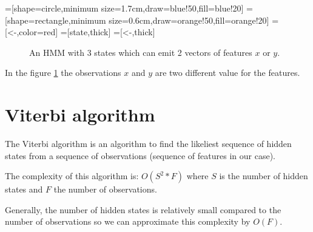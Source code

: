 \documentclass{techrep} %
\begin{document}
=[shape=circle,minimum size=1.7cm,draw=blue!50,fill=blue!20]
=[shape=rectangle,minimum size=0.6cm,draw=orange!50,fill=orange!20]
=[<-,color=red] =[state,thick]
=[<-,thick]
\begin{figure}[H]
  \begin{center}
  \end{center}
  \label{hmm}
  \caption{An HMM with 3 states which can emit 2 vectors of features $x$ or $y$.}
\end{figure}

In the figure \ref{hmm} the observations $x$ and $y$ are two different
value for the features.

\section{Viterbi algorithm}

The Viterbi algorithm is an algorithm to find the likeliest sequence
of hidden states from a sequence of observations (sequence of features
in our case).


The complexity of this algorithm is: $O(S^2*F)$ where
$S$ is the number of hidden states and $F$ the number of observations.


Generally, the number of hidden states is relatively small compared to the number
of observations so we can approximate this complexity by $O(F)$.
\end{document}
